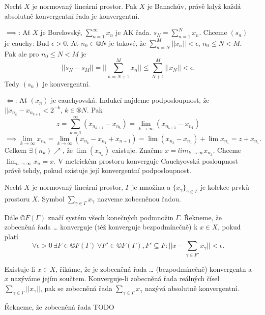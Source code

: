 \documentclass[12pt]{article}					%
\begin{document}
\begin{veta}
	Nechť $X$ je normovaný lineární prostor. Pak $X$ je Banachův, právě když každá absolutně konvergentní řada je konvergentní.

	\begin{dukazin}
		$\implies$: Ať $X$ je Borelovský, $\sum_{n=1}^∞ x_n$ je AK řada. $s_N = \sum_{n=1}^N x_n$. Chceme $(s_n)$ je cauchy: Buď $\epsilon > 0$. Ať $n_0 \in ®N$ je takové, že $\sum_{n=N}^M ||x_n|| < \epsilon$, $n_0 ≤ N < M$. Pak ale pro $n_0 ≤ N < M$ je
		$$ ||s_N - s_M|| = ||\sum_{n=N+1}^M x_n|| ≤ \sum_{N+1}^M||x_N|| < \epsilon. $$
		Tedy $(s_n)$ je konvergentní.

		$\Leftarrow$: Ať $(x_n)$ je cauchyovská. Indukcí najdeme podposloupnost, že $||x_{n_k} - x_{n_{k+1}} < 2^{-k}$, $k \in ®N$. Pak
		$$ z = \sum_{k=1}^∞(x_{n_{k+1}} - x_{n_k}) = \lim_{k \rightarrow ∞}(x_{n_{k+1}} - x_{n_1}) $$
		$$ \implies \lim_{k \rightarrow ∞} x_{n_k} = \lim_{k \rightarrow ∞} (x_{n_k} - x_{n_1} + x_{n+1}) = \lim(x_{n_k} - x_{n_1}) + \lim x_{n_1} = z + x_{n_1}. $$
		Celkem $\exists (n_k) \nearrow$, že $\lim(x_{n_k})$ existuje. Značme $x = lim_{k \rightarrow ∞} x_{n_k}$.
		Chceme $\lim_{n \rightarrow ∞} x_n = x$. V metrickém prostoru konverguje Cauchyovská posloupnost právě tehdy, pokud existuje její konvergentní podposloupnost.
	\end{dukazin}
\end{veta}

\begin{definice}
	Nechť $X$ je normovaný lineární prostor, $\Gamma$ je množina a $\{x_\gamma\}_{\gamma \in \Gamma}$ je kolekce prvků prostoru $X$. Symbol $\sum_{\gamma \in \Gamma} x_\gamma$ nazveme zobecněnou řadou.

	Dále $©F(\Gamma)$ značí systém všech konečných podmnožin $\Gamma$. Řekneme, že zobecněná řada … konverguje (též konverguje bezpodmínečně) k $x \in X$, pokud platí
	$$ \forall \epsilon > 0\ \exists F \in ©F(\Gamma)\ \forall F' \in ©F(\Gamma), F' \subseteq F: ||x - \sum_{\gamma \in F'} x_\gamma|| < \epsilon. $$

	Existuje-li $x \in X$, říkáme, že je zobecněná řada … (bezpodmínečně) konvergentn a $x$ nazýváme jejím součtem. Konverguje-li zobecněná řada reálných čísel $\sum_{\gamma \in \Gamma} ||x_\gamma||$, pak se zobecněná řada $\sum_{\gamma \in \Gamma} x_\gamma$ nazývá absolutně konvergentní.
\end{definice}

\begin{definice}
	Řekneme, že zobecněná řada TODO
\end{definice}
\end{document}

